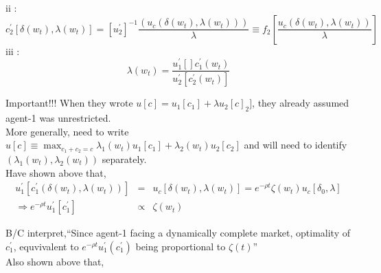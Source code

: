 \documentclass[]{article}
\begin{document}
ii :
\begin{equation}
c_2^\prime [\delta(w_t), \lambda (w_t)] = \left[u_2^\prime\right]^{-1} \frac{(u_c(\delta(w_t), \lambda(w_t)))}{\lambda} \equiv f_2\left[\frac{u_c(\delta(w_t), \lambda(w_t))}{\lambda}\right]\tag{19}
\end{equation}
iii : 
\begin{equation}
\lambda(w_t) = \frac{u_1^\prime []c_1^\prime(w_t) }{u_2^\prime[c_2^\prime(w_t)]}\tag{20}
\end{equation}

Important!!! When they wrote $u[c] = u_1[c_1] + \lambda u_2[c]_2]$, they already assumed agent-1 was unrestricted.\\

More generally, need to write $u[c] \equiv \max_{c_1+c_2=c} \lambda_1(w_t) u_1[c_1] + \lambda_2(w_t)u_2[c_2]$ and will need to identify $(\lambda_1(w_t), \lambda_2(w_t))$ separately.\\

Have shown above that, 
\begin{eqnarray*}
u_1^\prime[c_1^\prime(\delta(w_t), \lambda(w_t))] &=& u_c[\delta(w_t), \lambda(w_t)] = e^{-\rho t} \zeta(w_t) u_c[\delta_0, \lambda]\\
\Rightarrow e^{-\rho t} u_1^\prime[c_1^\prime] &\propto & \zeta(w_t)
\end{eqnarray*}

B/C interpret,``Since agent-1 facing a dynamically complete market, optimality of $c_1^\prime$, equvivalent to $e^{-\rho t} u_1^\prime(c_1^\prime)$ being proportional to $\zeta(t)$''\\

Also shown above that,
\begin{eqnarray*}
&&
\end{eqnarray*}
\end{document}
